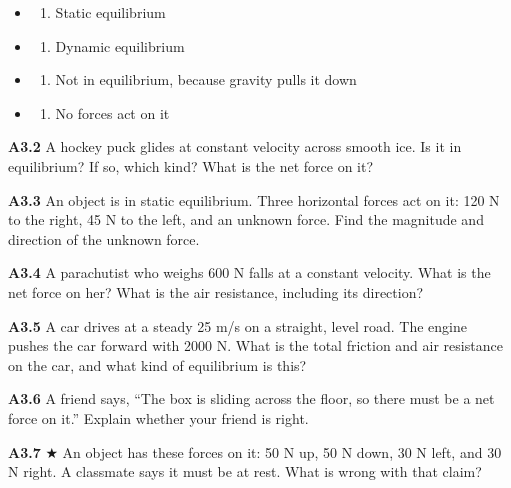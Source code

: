 \documentclass[
]{article}
\providecommand{\tightlist}{%
  \setlength{\itemsep}{0pt}\setlength{\parskip}{0pt}}
\begin{document}
\begin{itemize}
\tightlist
\item
  \begin{enumerate}
  \def\labelenumi{\Alph{enumi})}
  \tightlist
  \item
    Static equilibrium
  \end{enumerate}
\item
  \begin{enumerate}
  \def\labelenumi{\Alph{enumi})}
  \setcounter{enumi}{1}
  \tightlist
  \item
    Dynamic equilibrium
  \end{enumerate}
\item
  \begin{enumerate}
  \def\labelenumi{\Alph{enumi})}
  \setcounter{enumi}{2}
  \tightlist
  \item
    Not in equilibrium, because gravity pulls it down
  \end{enumerate}
\item
  \begin{enumerate}
  \def\labelenumi{\Alph{enumi})}
  \setcounter{enumi}{3}
  \tightlist
  \item
    No forces act on it
  \end{enumerate}
\end{itemize}

\textbf{A3.2} A hockey puck glides at constant velocity across smooth
ice. Is it in equilibrium? If so, which kind? What is the net force on
it?

\textbf{A3.3} An object is in static equilibrium. Three horizontal
forces act on it: 120 N to the right, 45 N to the left, and an unknown
force. Find the magnitude and direction of the unknown force.

\textbf{A3.4} A parachutist who weighs 600 N falls at a constant
velocity. What is the net force on her? What is the air resistance,
including its direction?

\textbf{A3.5} A car drives at a steady 25 m/s on a straight, level road.
The engine pushes the car forward with 2000 N. What is the total
friction and air resistance on the car, and what kind of equilibrium is
this?

\textbf{A3.6} A friend says, ``The box is sliding across the floor, so
there must be a net force on it.'' Explain whether your friend is right.

\textbf{A3.7} ★ An object has these forces on it: 50 N up, 50 N down, 30
N left, and 30 N right. A classmate says it must be at rest. What is
wrong with that claim?
\end{document}
